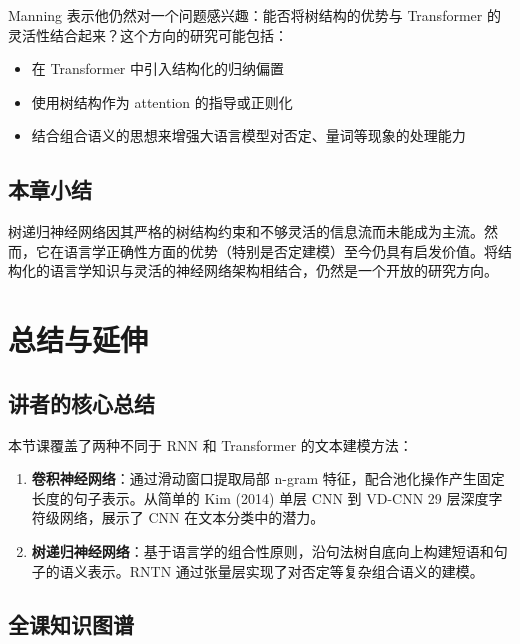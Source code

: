 \documentclass[a4paper]{article}
\begin{document}
Manning 表示他仍然对一个问题感兴趣：能否将树结构的优势与 Transformer 的灵活性结合起来？这个方向的研究可能包括：

\begin{itemize}
    \item 在 Transformer 中引入结构化的归纳偏置
    \item 使用树结构作为 attention 的指导或正则化
    \item 结合组合语义的思想来增强大语言模型对否定、量词等现象的处理能力
\end{itemize}

\subsection{本章小结}

树递归神经网络因其严格的树结构约束和不够灵活的信息流而未能成为主流。然而，它在语言学正确性方面的优势（特别是否定建模）至今仍具有启发价值。将结构化的语言学知识与灵活的神经网络架构相结合，仍然是一个开放的研究方向。


\section{总结与延伸}

\subsection{讲者的核心总结}

本节课覆盖了两种不同于 RNN 和 Transformer 的文本建模方法：

\begin{enumerate}
    \item \textbf{卷积神经网络}：通过滑动窗口提取局部 n-gram 特征，配合池化操作产生固定长度的句子表示。从简单的 Kim (2014) 单层 CNN 到 VD-CNN 29 层深度字符级网络，展示了 CNN 在文本分类中的潜力。
    \item \textbf{树递归神经网络}：基于语言学的组合性原则，沿句法树自底向上构建短语和句子的语义表示。RNTN 通过张量层实现了对否定等复杂组合语义的建模。
\end{enumerate}

\subsection{全课知识图谱}
\end{document}
